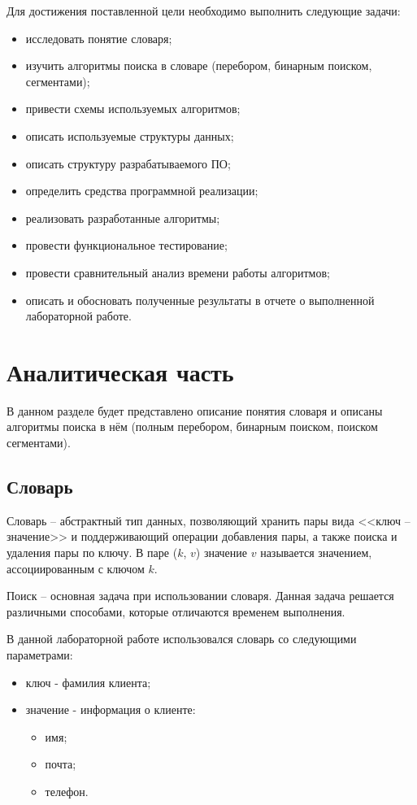 \documentclass[a4paper,14pt, unknownkeysallowed]{extreport}
\begin{document}
Для достижения поставленной цели необходимо выполнить следующие задачи:

\begin{itemize}
	\item исследовать понятие словаря;
	\item изучить алгоритмы поиска в словаре (перебором, бинарным поиском, сегментами);
	\item привести схемы используемых алгоритмов;
	\item описать используемые структуры данных;
	\item описать структуру разрабатываемого ПО;
	\item определить средства программной реализации;
	\item реализовать разработанные алгоритмы;
	\item провести функциональное тестирование;
	\item провести сравнительный анализ времени работы алгоритмов;
	\item описать и обосновать полученные результаты в отчете о выполненной лабораторной работе.
\end{itemize}





\chapter{Аналитическая часть}

В данном разделе будет представлено описание понятия словаря и описаны алгоритмы поиска в нём (полным перебором, бинарным поиском, поиском сегментами).

\section{Словарь}

Словарь -- абстрактный тип данных, позволяющий хранить пары вида <<ключ -- значение>> и поддерживающий операции добавления пары, а также поиска и удаления пары по ключу.
В паре ($k$, $v$) значение $v$ называется значением, ассоциированным с ключом $k$.

Поиск -- основная задача при использовании словаря. Данная задача решается различными способами, которые отличаются временем выполнения.

В данной лабораторной работе использовался словарь со  следующими параметрами:

\begin{itemize}
	\item ключ - фамилия клиента;
	\item значение - информация о клиенте:
	\begin{itemize}
		\item имя;
		\item почта;
		\item телефон.
	\end{itemize}
\end{itemize}
\end{document}
